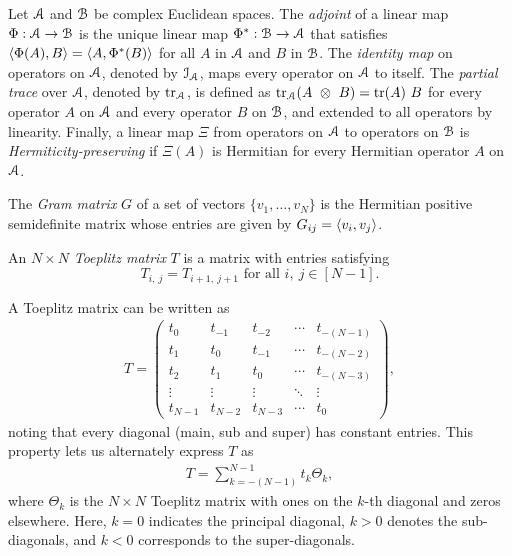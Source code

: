 Let $\mathcal{A}$ and $\mathcal{B}$ be complex Euclidean spaces. 
The \emph{adjoint} of a linear map $\Phi : \mathcal{A} \to \mathcal{B}$ is the unique linear map $\Phi^* : \mathcal{B} \to \mathcal{A}$ that satisfies $\left\langle \Phi(A), B \right\rangle = \left\langle A, \Phi^*(B) \right\rangle$ for all $A$ in $\mathcal{A}$ and $B$ in $\mathcal{B}$.
The \emph{identity map} on operators on $\mathcal{A}$, denoted by $\mathcal{I}_{\mathcal{A}}$, maps every operator on $\mathcal{A}$ to itself. 
The \emph{partial trace} over $\mathcal{A}$, denoted by $\tr_{\mathcal{A}}$, is defined as $\tr_{\mathcal{A}}(A\ \otimes\ B)=\tr(A)\ B$ for every operator $A$ on $\mathcal{A}$ and every operator $B$ on $\mathcal{B}$, and extended to all operators by linearity.
Finally, a linear map $\Xi$ from operators on $\mathcal{A}$ to operators on $\mathcal{B}$ is \emph{Hermiticity-preserving} if $\Xi(A)$ is Hermitian for every Hermitian operator $A$ on $\mathcal{A}$.

The \emph{Gram matrix} $G$ of a set of vectors $\{v_1, \dots, v_N\}$ is the Hermitian positive semidefinite matrix whose entries are given by $G_{ij} = \left\langle v_i, v_j \right\rangle$.

An $N \times N$ \emph{Toeplitz matrix} $T$ is a matrix with entries satisfying  
\begin{equation}
    T_{i,\ j} = T_{i + 1,\ j + 1} \text{ for all } i,\ j \in [N-1].
\end{equation}

A Toeplitz matrix can be written as
\begin{align*}
    T = 
        \begin{pmatrix}
            t_0 & t_{-1} & t_{-2} & \cdots & t_{-(N - 1)} \\
            t_1 & t_0 & t_{-1} & \cdots & t_{-(N - 2)} \\
            t_2 & t_1 & t_0 & \cdots & t_{-(N - 3)} \\
            \vdots & \vdots & \vdots & \ddots & \vdots \\
            t_{N - 1} & t_{N - 2} & t_{N - 3} & \cdots & t_0
        \end{pmatrix},
\end{align*}
noting that every diagonal (main, sub and super) has constant entries.
This property lets us alternately express $T$ as
\begin{align}
    \label{eq:Toep_mat}
    T = \sum_{k = -(N-1)}^{N-1} t_k \Theta_{k},
\end{align}
where $\Theta_k$ is the $N \times N$ Toeplitz matrix with ones on the $k$-th diagonal and zeros elsewhere.
Here, $k = 0$ indicates the principal diagonal, $k > 0$ denotes the sub-diagonals, and $k < 0$ corresponds to the super-diagonals.

